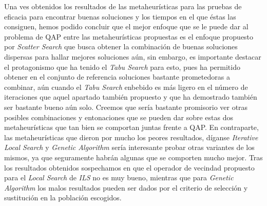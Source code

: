 \documentclass{ci5652}
\begin{document}
Una ves obtenidos los resultados de las metaheurísticas para las pruebas de eficacia para encontrar buenas soluciones y los tiempos en el que éstas las consiguen, hemos podido concluir que el mejor enfoque que se le puede dar al problema de QAP entre las metaheurísticas propuestas es el enfoque propuesto por \textit{Scatter Search} que busca obtener la combinación de buenas soluciones dispersas para hallar mejores soluciones aún, sin embargo, es importante destacar el protagonismo que ha tenido el \textit{Tabu Search} para esto, pues ha permitido obtener en el conjunto de referencia soluciones bastante prometedoras a combinar, aún cuando el \textit{Tabu Search} enbebido es más ligero en el número de iteraciones que aquel apartado también propuesto y que ha demostrado también ser bastante bueno aún solo. Creemos que sería bastante promisorio ver otras posibles combinaciones y entonaciones que se pueden dar sobre estas dos metaheurísticas que tan bien se comportan juntas frente a QAP. En contraparte, las metaheurísticas que dieron por mucho los peores resultados, díganse \textit{Iterative Local Search} y \textit{Genetic Algorithm} sería interesante probar otras variantes de los mismos, ya que seguramente habrán algunas que se comporten mucho mejor. Tras los resultados obtenidos sospechamos en que el operador de vecindad propuesto para el \textit{Local Search} de \textit{ILS} no es muy bueno, mientras que para \textit{Genetic Algorithm} los malos resultados pueden ser dados por el criterio de selección y sustitución en la población escogidos.
%


\small

 
\end{document}
